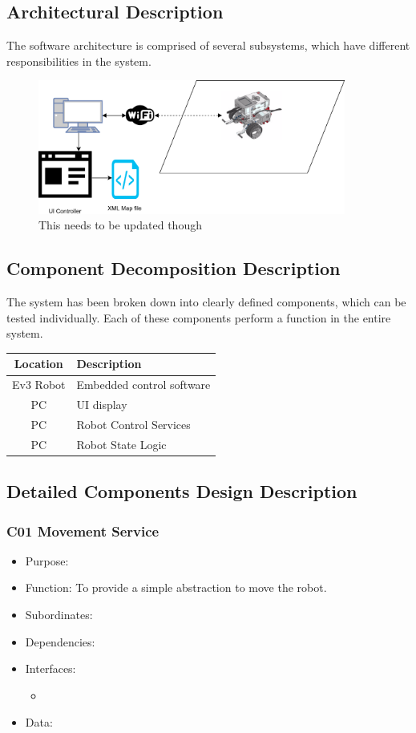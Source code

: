 \subsection{Architectural Description}
The software architecture is comprised of several subsystems, which have different responsibilities in the system.

\begin{figure}
	\centering
	\includegraphics[width=0.9\textwidth]{Robot_system.png}	
	\caption{\label{fig:erd}This needs to be updated though}
\end{figure}	

\subsection{Component Decomposition Description}
The system has been broken down into clearly defined components, which can be tested individually. Each of these components perform a function in the entire system.

\begin{tabular}{|c|l|}
	\hline 
	\bf{Location} & \bf{Description} \\ 
	\hline 
	\hline 
	Ev3 Robot & Embedded control software \\ 
	\hline 
	PC & UI display \\ 
	\hline 
	PC & Robot Control Services \\ 
	\hline 
	PC & Robot State Logic \\ 
	\hline 
\end{tabular} 

\subsection{Detailed Components Design Description}
\subsubsection{C01 Movement Service}
\begin{itemize}
	\item Purpose: 
	\item Function: To provide a simple abstraction to move the robot.
	\item Subordinates: 
	\item Dependencies: 
	\item Interfaces: 
	\begin{itemize}
		\item 
	\end{itemize}
	\item Data: 
\end{itemize}

